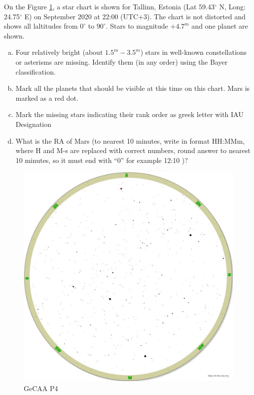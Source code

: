 \documentclass[a4paper,12pt]{extarticle}
\begin{document}
On the Figure \ref{GeCAA_2}, a star chart is shown for Tallinn, Estonia (Lat 59.43$^\circ$ N, Long: 24.75$^\circ$ E) on  September 2020 at 22:00 (UTC+3). The chart is not distorted and shows all laltitudes from $0^\circ$ to $90^\circ$. Stars to magnitude $+4.7^m$ and one planet are shown.
\begin{enumerate}[a.]
    \item Four relatively bright (about $1.5^m- 3.5^m$) stars in well-known constellations or asterisms are missing. Identify them (in any order) using the Bayer classification.
    \item Mark all the planets that should be visible at this time on this chart. Mars is marked as a red dot. 
    \item Mark the missing stars indicating their rank order as greek letter with IAU Designation
    \item What is the RA of Mars (to nearest 10 minutes, write in format HH:MMm, where H and M-s are replaced with correct numbers, round answer to nearest 10 minutes, so it must end with “0” for example 12:10 )?
\end{enumerate}
\begin{figure}
    \centering
    \includegraphics[width=0.95\linewidth]{GeCAA_2.png}
    \caption{GeCAA P4}
    \label{GeCAA_2}
\end{figure}

\clearpage
\end{document}
